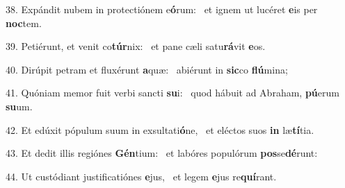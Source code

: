 38. Expándit nubem in protectiónem e\textbf{ó}rum: \ast\  et ignem ut lucéret \textbf{e}is per \textbf{noc}tem.\

39. Petiérunt, et venit co\textbf{túr}nix: \ast\  et pane cæli satu\textbf{rá}vit \textbf{e}os.\

40. Dirúpit petram et fluxérunt \textbf{a}quæ: \ast\  abiérunt in \textbf{sic}co \textbf{flú}mina;\

41. Quóniam memor fuit verbi sancti \textbf{su}i: \ast\  quod hábuit ad Abraham, \textbf{pú}erum \textbf{su}um.\

42. Et edúxit pópulum suum in exsultati\textbf{ó}ne, \ast\  et eléctos suos \textbf{in} læ\textbf{tí}tia.\

43. Et dedit illis regiónes \textbf{Gén}tium: \ast\  et labóres populórum \textbf{pos}se\textbf{dé}runt:\

44. Ut custódiant justificatiónes \textbf{e}jus, \ast\  et legem \textbf{e}jus re\textbf{quí}rant.\

